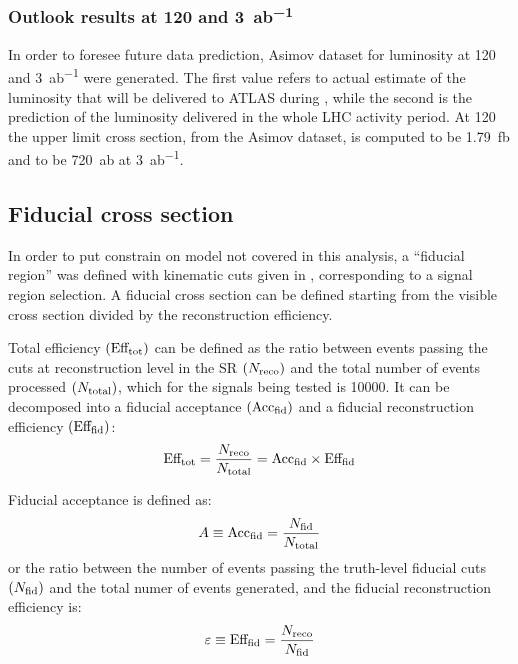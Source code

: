 

\subsubsection{Outlook results at \SI{120}{\ifb} and \SI{3}{ab^{-1}}}
 In order to foresee future data prediction, Asimov dataset for luminosity at \SI{120}{\ifb} and \SI{3}{ab^{-1}} were generated. The first value refers to actual estimate of the luminosity that will be delivered to ATLAS during \RunTwo, while the second is the prediction of the luminosity delivered in the whole LHC activity period. At \SI{120}{\ifb} the upper limit cross section, from the Asimov dataset, is computed to be \SI{1.79}{fb} and to be \SI{720}{ab} at \SI{3}{ab^{-1}}.





\subsection{Fiducial cross section}
In order to put constrain on model not covered in this analysis, a ``fiducial region'' was defined with kinematic cuts given in \Sect{\ref{sec:truth}}, corresponding to a signal region selection. A fiducial cross section can be defined starting from the visible cross section divided by the reconstruction efficiency.

Total efficiency $\left(\text{Eff}_\textup{tot}\right)$ can be defined as the ratio between events passing the cuts at reconstruction level in the SR $\left(N_\textup{reco}\right)$ and the total number of events processed $\left(N_\textup{total}\right)$, which for the signals being tested is \num{10000}. It can be decomposed into a fiducial acceptance $\left(\text{Acc}_\textup{fid}\right)$ and a fiducial reconstruction efficiency $\left(\text{Eff}_\textup{fid}\right)$:
\begin{equation}
	\text{Eff}_\textup{tot}=\frac{N_\textup{reco}}{N_\textup{total}}=\text{Acc}_\textup{fid}\times\text{Eff}_\textup{fid}
\end{equation}

Fiducial acceptance is defined as:
\begin{equation}
	A\equiv\text{Acc}_\textup{fid}=\frac{N_\textup{fid}}{N_\textup{total}}
	\label{eqn:accfid}
\end{equation}
or the ratio between the number of events passing the truth-level fiducial cuts $\left(N_\textup{fid}\right)$ and the total numer of events generated, and the fiducial reconstruction efficiency is:
\begin{equation}
	\epsilon\equiv\text{Eff}_\textup{fid}=\frac{N_\textup{reco}}{N_\textup{fid}}
	\label{eqn:efffid}
\end{equation}

